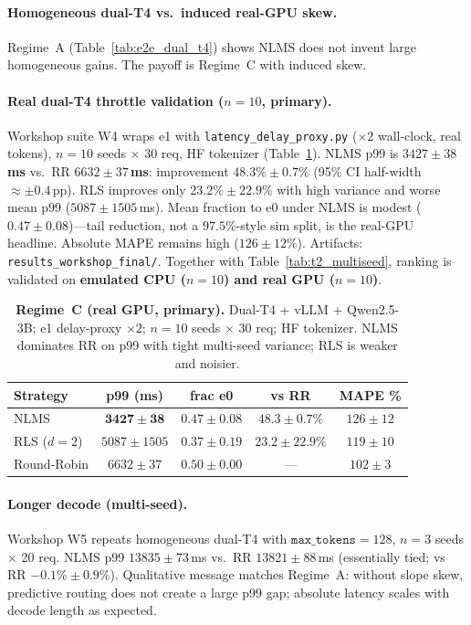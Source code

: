 \documentclass[10pt,twocolumn,letterpaper]{article}
\begin{document}
\paragraph{Homogeneous dual-T4 vs.\ induced real-GPU skew.}
Regime~A (Table~\ref{tab:e2e_dual_t4}) shows NLMS does not invent large homogeneous gains. The payoff is Regime~C with induced skew.

\paragraph{Real dual-T4 throttle validation ($n{=}10$, primary).}
\label{sec:real_hetero}
Workshop suite W4 wraps e1 with \texttt{latency\_delay\_proxy.py} ($\times 2$ wall-clock, real tokens), $n{=}10$ seeds $\times$ 30 req, HF tokenizer (Table~\ref{tab:real_hetero}). NLMS p99 is \textbf{$3427\pm38$\,ms} vs.\ RR \textbf{$6632\pm37$\,ms}: improvement \textbf{$48.3\%\pm0.7\%$} (95\% CI half-width $\approx\pm0.4$\,pp). RLS improves only $23.2\%\pm22.9\%$ with high variance and worse mean p99 ($5087\pm1505$\,ms). Mean fraction to e0 under NLMS is modest ($0.47\pm0.08$)---tail reduction, not a $97.5\%$-style sim split, is the real-GPU headline. Absolute MAPE remains high ($126\pm12\%$). Artifacts: \texttt{results\_workshop\_final/}. Together with Table~\ref{tab:t2_multiseed}, ranking is validated on \textbf{emulated CPU ($n{=}10$) and real GPU ($n{=}10$)}.

\begin{table}[t]
\centering
\scriptsize
\setlength{\tabcolsep}{2.5pt}
\begin{tabular}{@{}lcccc@{}}
\toprule
\textbf{Strategy} & \textbf{p99 (ms)} & \textbf{frac e0} & \textbf{vs RR} & \textbf{MAPE \%} \\
\midrule
NLMS & $\mathbf{3427 \pm 38}$ & $0.47 \pm 0.08$ & $\mathbf{48.3 \pm 0.7\%}$ & $126 \pm 12$ \\
RLS ($d{=}2$) & $5087 \pm 1505$ & $0.37 \pm 0.19$ & $23.2 \pm 22.9\%$ & $119 \pm 10$ \\
Round-Robin & $6632 \pm 37$ & $0.50 \pm 0.00$ & --- & $102 \pm 3$ \\
\bottomrule
\end{tabular}
\caption{\textbf{Regime~C (real GPU, primary).} Dual-T4 + vLLM + Qwen2.5-3B; e1 delay-proxy $\times 2$; $n{=}10$ seeds $\times$ 30 req; HF tokenizer. NLMS dominates RR on p99 with tight multi-seed variance; RLS is weaker and noisier.}
\label{tab:real_hetero}
\end{table}

\paragraph{Longer decode (multi-seed).}
\label{sec:long_decode}
Workshop W5 repeats homogeneous dual-T4 with $\texttt{max\_tokens}{=}128$, $n{=}3$ seeds $\times$ 20 req. NLMS p99 $13835\pm73$\,ms vs.\ RR $13821\pm88$\,ms (essentially tied; vs RR $-0.1\%\pm0.9\%$). Qualitative message matches Regime~A: without slope skew, predictive routing does not create a large p99 gap; absolute latency scales with decode length as expected.
\end{document}

